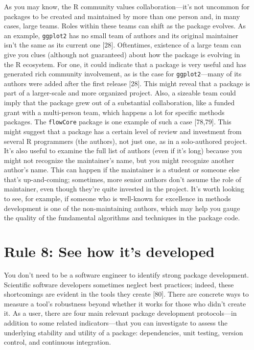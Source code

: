\documentclass[10pt,letterpaper]{article}
\begin{document}
As you may know, the R community values collaboration---it's not
uncommon for packages to be created and maintained by more than one
person and, in many cases, large teams. Roles within these teams can
shift as the package evolves. As an example, \texttt{ggplot2} has no
small team of authors and its original maintainer isn't the same as its
current one {[}28{]}. Oftentimes, existence of a large team can give you
clues (although not guaranteed) about how the package is evolving in the
R ecosystem. For one, it could indicate that a package is very useful
and has generated rich community involvement, as is the case for
\texttt{ggplot2}---many of its authors were added after the first
release {[}28{]}. This might reveal that a package is part of a
larger-scale and more organized project. Also, a sizeable team could
imply that the package grew out of a substantial collaboration, like a
funded grant with a multi-person team, which happens a lot for specific
methods packages. The \texttt{flowCore} package is one example of such a
case {[}78,79{]}. This might suggest that a package has a certain level
of review and investment from several R programmers (the authors), not
just one, as in a solo-authored project. It's also useful to examine the
full list of authors (even if it's long) because you might not recognize
the maintainer's name, but you might recognize another author's name.
This can happen if the maintainer is a student or someone else that's
up-and-coming; sometimes, more senior authors don't assume the role of
maintainer, even though they're quite invested in the project. It's
worth looking to see, for example, if someone who is well-known for
excellence in methods development is one of the non-maintaining authors,
which may help you gauge the quality of the fundamental algorithms and
techniques in the package code.

\hypertarget{rule-8-see-how-its-developed}{%
\section{Rule 8: See how it's
developed}\label{rule-8-see-how-its-developed}}

You don't need to be a software engineer to identify strong package
development. Scientific software developers sometimes neglect best
practices; indeed, these shortcomings are evident in the tools they
create {[}80{]}. There are concrete ways to measure a tool's robustness
beyond whether it works for those who didn't create it. As a user, there
are four main relevant package development protocols---in addition to
some related indicators---that you can investigate to assess the
underlying stability and utility of a package: dependencies, unit
testing, version control, and continuous integration.
\end{document}
